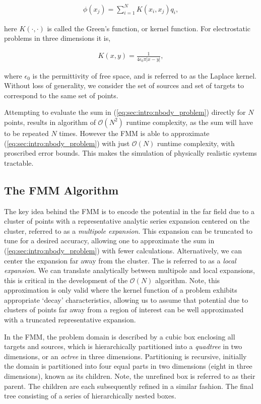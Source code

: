 \documentclass{IEEEcsmag}
\begin{document}
\begin{eqnarray}
	\phi(x_j) = \sum_{i=1}^{N} K(x_i, x_j) q_i,
\label{eq:sec:intro:nbody_problem}
\end{eqnarray}

here $K(\cdot, \cdot)$ is called the Green's function, or kernel function. For electrostatic problems in three dimensions it is,

\begin{eqnarray}
	K(x, y) = \frac{1}{4\epsilon_0\pi|x-y|},
\label{eq:sec:intro:laplace_kernel}
\end{eqnarray}

where $\epsilon_0$ is the permittivity of free space, and is referred to as the Laplace kernel. Without loss of generality, we consider the set of sources and set of targets to correspond to the same set of points.

Attempting to evaluate the sum in (\ref{eq:sec:intro:nbody_problem}) directly for $N$ points, results in algorithm of $\mathcal{O}(N^2)$ runtime complexity, as the sum will have to be repeated $N$ times. However the FMM is able to approximate (\ref{eq:sec:intro:nbody_problem}) with just $\mathcal{O}(N)$ runtime complexity, with proscribed error bounds. This makes the simulation of physically realistic systems tractable.

\subsection{The FMM Algorithm}\label{sec:intro:algorithm}

The key idea behind the FMM is to encode the potential in the far field due to a cluster of points with a representative analytic series expansion centered on the cluster, referred to as a \textit{multipole expansion}. This expansion can be truncated to tune for a desired accuracy, allowing one to approximate the sum in (\ref{eq:sec:intro:nbody_problem}) with fewer calculations. Alternatively, we can center the expansion far away from the cluster. The is referred to as a \textit{local expansion}. We can translate analytically between multipole and local expansions, this is critical in the development of the $\mathcal{O}(N)$ algorithm. Note, this approximation is only valid where the kernel function of a problem exhibits appropriate `decay' characteristics, allowing us to assume that potential due to clusters of points far away from a region of interest can be well approximated with a truncated representative expansion.

In the FMM, the problem domain is described by a cubic box enclosing all targets and sources, which is hierarchically partitioned into a \textit{quadtree} in two dimensions, or an \textit{octree} in three dimensions. Partitioning is recursive, initially the domain is partitioned into four equal parts in two dimensions (eight in three dimensions), known as its children. Note, the unrefined box is referred to as their parent. The children are each subsequently refined in a similar fashion. The final tree consisting of a series of hierarchically nested boxes.
\end{document}
